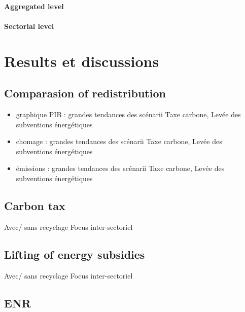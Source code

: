 \documentclass[
]{article}
\providecommand{\tightlist}{%
  \setlength{\itemsep}{0pt}\setlength{\parskip}{0pt}}
\begin{document}
\hypertarget{aggregated-level}{%
\paragraph{Aggregated level}\label{aggregated-level}}

\hypertarget{sectorial-level}{%
\paragraph{Sectorial level}\label{sectorial-level}}

\hypertarget{results-et-discussions}{%
\section{Results et discussions}\label{results-et-discussions}}

\hypertarget{comparasion-of-redistribution}{%
\subsection{Comparasion of
redistribution}\label{comparasion-of-redistribution}}

\begin{itemize}
\tightlist
\item
  graphique PIB : grandes tendances des scénarii Taxe carbone, Levée des
  subventions énergétiques
\item
  chomage : grandes tendances des scénarii Taxe carbone, Levée des
  subventions énergétiques
\item
  émissions : grandes tendances des scénarii Taxe carbone, Levée des
  subventions énergétiques
\end{itemize}

\hypertarget{carbon-tax-1}{%
\subsection{Carbon tax}\label{carbon-tax-1}}

Avec/ sans recyclage Focus inter-sectoriel

\hypertarget{lifting-of-energy-subsidies}{%
\subsection{Lifting of energy
subsidies}\label{lifting-of-energy-subsidies}}

Avec/ sans recyclage Focus inter-sectoriel

\hypertarget{enr}{%
\subsection{ENR}\label{enr}}
\end{document}
